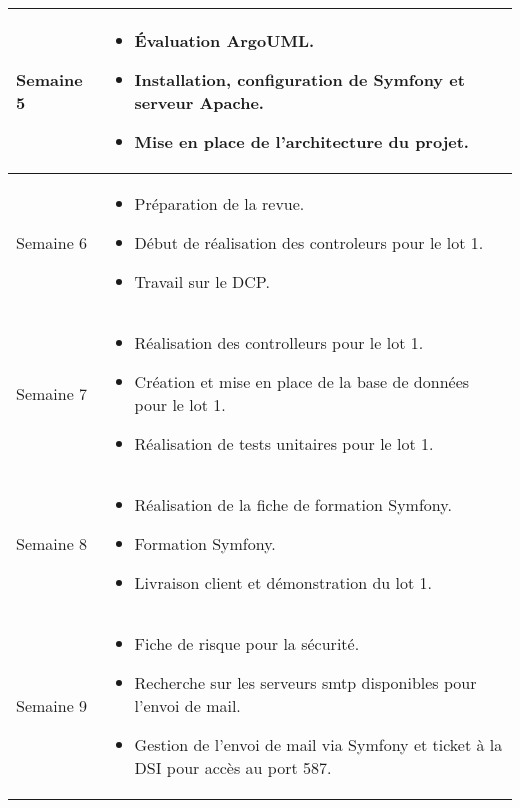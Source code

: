 \documentclass [a4paper] {article}
\begin{document}
\section*{\Florian}

\centering
	\begin{longtable}{|>{\columncolor{gray!40}}p{2cm}|p{12cm}|}
	\hline
	Semaine 5 & \begin{itemize}
        \item Évaluation ArgoUML.
        \item Installation, configuration de Symfony et serveur Apache.
        \item Mise en place de l'architecture du projet.
        \end{itemize}\\  
	\hline
        Semaine 6 & \begin{itemize}
	\item Préparation de la revue.
	\item Début de réalisation des controleurs pour le lot 1.
        \item Travail sur le DCP.  
	\end{itemize} \\
	\hline
        Semaine 7 & \begin{itemize}
	\item Réalisation des controlleurs pour le lot 1.
        \item Création et mise en place de la base de données pour le lot 1.
	\item Réalisation de tests unitaires pour le lot 1.
	\end{itemize} \\
	\hline
        Semaine 8 & \begin{itemize}
	\item Réalisation de la fiche de formation Symfony.
        \item Formation Symfony.
        \item Livraison client et démonstration du lot 1.  
	\end{itemize} \\
	\hline
 	Semaine 9 & \begin{itemize}
	\item Fiche de risque pour la sécurité.
        \item Recherche sur les serveurs smtp disponibles pour l'envoi de mail.
        \item Gestion de l'envoi de mail via Symfony et ticket à la DSI pour accès au port 587.
	\end{itemize} \\

\end{longtable}
\end{document}
